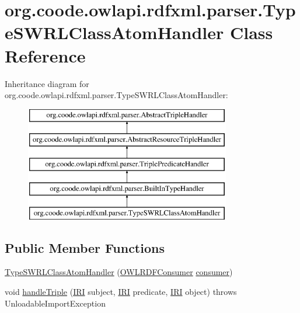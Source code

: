 \hypertarget{classorg_1_1coode_1_1owlapi_1_1rdfxml_1_1parser_1_1_type_s_w_r_l_class_atom_handler}{\section{org.\-coode.\-owlapi.\-rdfxml.\-parser.\-Type\-S\-W\-R\-L\-Class\-Atom\-Handler Class Reference}
\label{classorg_1_1coode_1_1owlapi_1_1rdfxml_1_1parser_1_1_type_s_w_r_l_class_atom_handler}
}
Inheritance diagram for org.\-coode.\-owlapi.\-rdfxml.\-parser.\-Type\-S\-W\-R\-L\-Class\-Atom\-Handler\-:\begin{figure}[H]
\begin{center}
\leavevmode
\includegraphics[height=5.000000cm]{classorg_1_1coode_1_1owlapi_1_1rdfxml_1_1parser_1_1_type_s_w_r_l_class_atom_handler}
\end{center}
\end{figure}
\subsection*{Public Member Functions}
\begin{DoxyCompactItemize}
\item 
\hyperlink{classorg_1_1coode_1_1owlapi_1_1rdfxml_1_1parser_1_1_type_s_w_r_l_class_atom_handler_acc05d20a48149445ba61297a0644b02f}{Type\-S\-W\-R\-L\-Class\-Atom\-Handler} (\hyperlink{classorg_1_1coode_1_1owlapi_1_1rdfxml_1_1parser_1_1_o_w_l_r_d_f_consumer}{O\-W\-L\-R\-D\-F\-Consumer} \hyperlink{classorg_1_1coode_1_1owlapi_1_1rdfxml_1_1parser_1_1_abstract_triple_handler_a4ccf4d898ff01eb1cadfa04b23d54e9c}{consumer})
\item 
void \hyperlink{classorg_1_1coode_1_1owlapi_1_1rdfxml_1_1parser_1_1_type_s_w_r_l_class_atom_handler_a15e0196dd2fe63e0d52a792d32a9d851}{handle\-Triple} (\hyperlink{classorg_1_1semanticweb_1_1owlapi_1_1model_1_1_i_r_i}{I\-R\-I} subject, \hyperlink{classorg_1_1semanticweb_1_1owlapi_1_1model_1_1_i_r_i}{I\-R\-I} predicate, \hyperlink{classorg_1_1semanticweb_1_1owlapi_1_1model_1_1_i_r_i}{I\-R\-I} object)  throws Unloadable\-Import\-Exception 
\end{DoxyCompactItemize}
